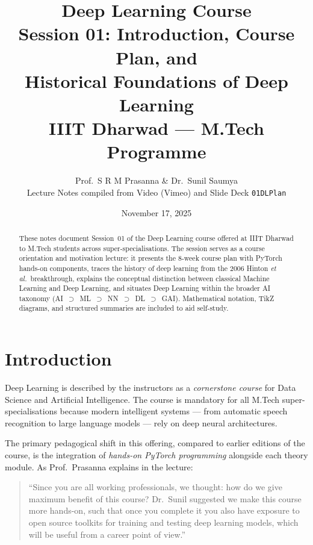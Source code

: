 \documentclass[12pt,a4paper]{article}
\title{%
  \vspace{-1cm}
  {\Large\bfseries Deep Learning Course}\\[4pt]
  {\large Session 01: Introduction, Course Plan, and\\
   Historical Foundations of Deep Learning}\\[6pt]
  {\normalsize IIIT Dharwad --- M.Tech Programme}
}
\author{%
  Prof.\ S R M Prasanna \quad \& \quad Dr.\ Sunil Saumya\\[4pt]
  \small Lecture Notes compiled from Video (Vimeo) and Slide Deck \texttt{01DLPlan}
}
\date{November 17, 2025}
\begin{document}

\maketitle
\thispagestyle{fancy}

\begin{abstract}
These notes document Session~01 of the Deep Learning course offered at
IIIT Dharwad to M.Tech students across super-specialisations.  The session
serves as a course orientation and motivation lecture: it presents the
8-week course plan with PyTorch hands-on components, traces the history of
deep learning from the 2006 Hinton \emph{et al.}\ breakthrough, explains the
conceptual distinction between classical Machine Learning and Deep Learning,
and situates Deep Learning within the broader AI taxonomy
(AI~$\supset$~ML~$\supset$~NN~$\supset$~DL~$\supset$~GAI).  Mathematical
notation, TikZ diagrams, and structured summaries are included to aid
self-study.
\end{abstract}

\tableofcontents
\newpage

\section{Introduction}
\label{sec:intro}

Deep Learning is described by the instructors as a \emph{cornerstone course}
for Data Science and Artificial Intelligence.  The course is mandatory for all
M.Tech super-specialisations because modern intelligent systems — from
automatic speech recognition to large language models — rely on deep neural
architectures.

The primary pedagogical shift in this offering, compared to earlier editions of
the course, is the integration of \emph{hands-on PyTorch programming} alongside
each theory module.  As Prof.\ Prasanna explains in the lecture:

\begin{quote}
``Since you are all working professionals, we thought: how do we give
maximum benefit of this course?  Dr.\ Sunil suggested we make this course
more hands-on, such that once you complete it you also have exposure to open
source toolkits for training and testing deep learning models, which will be
useful from a career point of view.''
\end{quote}
\end{document}

